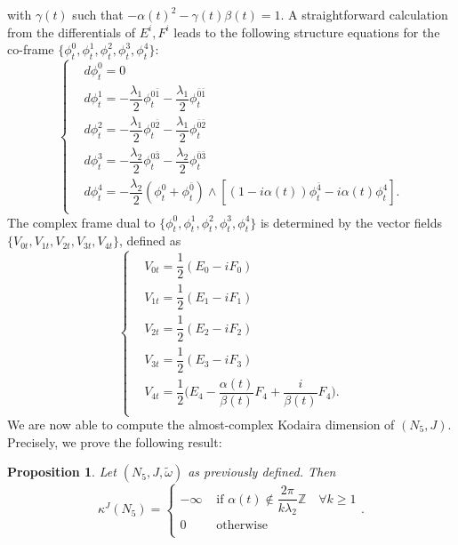 \documentclass[a4paper, 11pt]{amsart}
\theoremstyle{plain}
\newtheorem{proposizione}{Proposition} [section]
\theoremstyle{definition}
\numberwithin{equation}{section}
\begin{document}
with $\gamma(t)$ such that $ -\alpha(t)^{2} -\gamma(t)\beta(t) = 1 $. A straightforward calculation from the differentials of $ E^{i}, F^{i} $ leads to the following structure equations for the co-frame $ \{\phi_{t}^{0}, \phi_{t}^{1} , \phi_{t}^{2},\phi_{t}^{3} , \phi_{t}^{4}\} $:
\begin{equation}\label{EqStrutturaKodairaGenNakamura}
\left\{
	\begin{split}
    	& d\phi_{t}^{0} = 0 \\
		& d\phi_{t}^{1} = -\dfrac{\lambda_{1}}{2}\phi_{t}^{0\bar 1} -\dfrac{\lambda_{1}}{2}\phi_{t}^{\bar 0 \bar 1} \\
		&d\phi_{t}^{2} = -\dfrac{\lambda_{1}}{2}\phi_{t}^{0\bar 2} -\dfrac{\lambda_{1}}{2}\phi_{t}^{\bar 0 \bar2} \\
		&d\phi_{t}^{3} = -\dfrac{\lambda_{2}}{2}\phi_{t}^{0\bar 3} -\dfrac{\lambda_{2}}{2}\phi_{t}^{\bar 0 \bar3} \\
		&d\phi_{t}^{4} = -\dfrac{\lambda_{2}}{2}(\phi_{t}^{0} + \phi_{t}^{\bar0}) \wedge [(1-i\alpha(t))\phi_{t}^{\bar4} - i\alpha(t)\phi_{t}^{4}]. \\
	\end{split}
    \right.
\end{equation}
The complex frame dual to $ \{\phi_{t}^{0}, \phi_{t}^{1} , \phi_{t}^{2},\phi_{t}^{3} , \phi_{t}^{4}\}$ is determined by the vector fields $ \{V_{0t}, V_{1t}, V_{2t}, V_{3t}, V_{4t}\} $, defined as
\begin{equation}\label{RifDualeKodairaGenNakamura}
\left\{
	\begin{split}
		&V_{0t} = \dfrac{1}{2}(E_{0} - iF_{0}) \\
		&V_{1t} = \dfrac{1}{2}(E_{1} - iF_{1}) \\
		&V_{2t} = \dfrac{1}{2}(E_{2} - iF_{2}) \\
		&V_{3t} = \dfrac{1}{2}(E_{3} - iF_{3}) \\
		&V_{4t} = \dfrac{1}{2}\bigg(E_{4} - \dfrac{\alpha(t)}{\beta(t)}F_{4} + \dfrac{i}{\beta(t)}F_{4}\bigg). \\
	\end{split}
    \right.
\end{equation}
We are now able to compute the almost-complex Kodaira dimension of $ (N_{5}, J) $. Precisely, we prove the following result:
\begin{proposizione}
	Let $ (N_{5}, J, \tilde{\omega}) $ as previously defined. Then  
	\[ \kappa^{J}(N_{5}) = \begin{cases}
		-\infty & \text{ if } \alpha(t) \notin \dfrac{2\pi}{k\lambda_{2}}\mathbb{Z} \quad \forall k \ge 1 \\
		0 & \text{ otherwise } \\
	\end{cases}. \] 
\end{proposizione}
\end{document}
